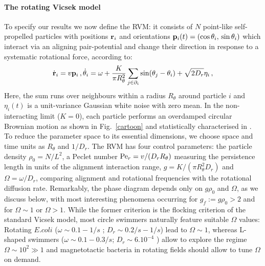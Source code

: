 \documentclass[aps,twocolumn,showlabels,showrefs,amsmath,amssymb,pre,superscriptaddress, floatfix, colors]{revtex4}
\newcommand{\1}{\begin{equation}}
\newcommand{\2}{\end{equation}}
\newcommand{\4}[2]{{\frac{#1}{#2}}}
\begin{document}
\paragraph*{The rotating Vicsek model} 
To specify our results we now define the RVM: it consists 
of $N$ point-like self-propelled particles with positions ${\bf r}_i$ and orientations ${\bf p}_i(t)=(\cos \theta_i,\,\sin\theta_i)$
which interact via an aligning pair-potential and change their direction in response to a systematic rotational force, according to: 
\begin{equation}
\dot{\bf r}_i=v {\bf p}_i \, , \dot{{\theta}}_i=\omega +\frac{K}{\pi R_{\theta}^2}\sum_{j \in \partial_i}\sin(\theta_j-\theta_i)+\sqrt{2D_r}{\eta}_i\,,
\end{equation}
Here, the sum runs over neighbours within a radius $R_\theta$ around particle $i$ and ${\eta}_i(t)$ is a unit-variance Gaussian white noise with zero mean. 
In the non-interacting limit ($K=0$), each particle performs 
an overdamped circular Brownian motion as shown in Fig.~\ref{cartoon} and statistically characterised in \cite{vanTeeffelen2008}.
To reduce the parameter space to its essential dimensions, we 
choose space and time units as $R_\theta$ and $1/D_r$. 
The RVM has four control parameters: the particle density $\rho_0=N/L^2$, 
a Peclet number ${\rm Pe}_{r}=v/(D_r R_\theta)$ measuring the persistence length in units of the alignment interaction range,
$g=K/(\pi R_\theta^2 D_r)$ and $\Omega=\omega/ D_r$, comparing alignment and rotational frequencies with the rotational diffusion rate.  
Remarkably, the phase diagram depends only on $g\rho_0$ and $\Omega$, as we discuss below, with most interesting phenomena occurring for 
$g_f:=g\rho_0 > 2$ and for $\Omega \sim 1$ or $\Omega >1$.
While the former criterion is the flocking criterion of the standard Vicsek model, 
most circle swimmers naturally feature suitable $\Omega$ values:
Rotating $E.coli$ ($\omega\sim 0.1-1 /s$ \cite{Lauga2006}; $D_r \sim 0.2/s-1/s$) lead to 
$\Omega \sim 1$, whereas L-shaped swimmers ($\omega \sim 0.1-0.3/s$; $D_r\sim 6 .10^{-4}$ \cite{Kummel2013}) allow to explore the regime $\Omega \sim 10^2\gg 1$
and magnetotactic bacteria in rotating fields should allow to tune $\Omega$ on demand. 
%
\end{document}
